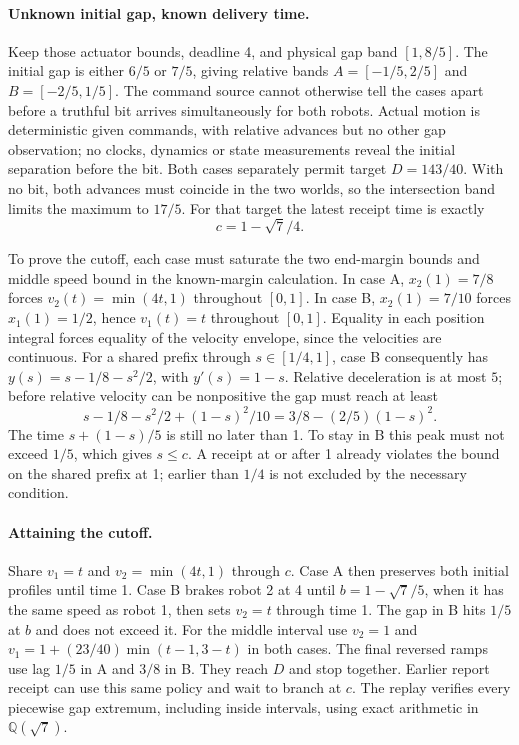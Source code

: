 \documentclass[11pt]{article}
\begin{document}
\paragraph{Unknown initial gap, known delivery time.}
Keep those actuator bounds, deadline 4, and physical gap band
\([1,8/5]\). The initial gap is either \(6/5\) or \(7/5\),
giving relative bands \(A=[-1/5,2/5]\) and \(B=[-2/5,1/5]\).
The command source cannot otherwise tell the cases apart before
a truthful bit arrives simultaneously for both robots. Actual
motion is deterministic given commands, with relative advances
but no other gap observation; no clocks, dynamics or state
measurements reveal the initial separation before the bit.
Both cases separately permit target \(D=143/40\). With no bit,
both advances must coincide in the two worlds, so the intersection
band limits the maximum to \(17/5\).
For that target the latest receipt time is exactly
\[
                              c=1-\sqrt{7}/4.
\]

To prove the cutoff, each case must saturate the two end-margin
bounds and middle speed bound in the known-margin calculation.
In case A, \(x_2(1)=7/8\) forces
\(v_2(t)=\min(4t,1)\) throughout \([0,1]\).
In case B, \(x_2(1)=7/10\) forces \(x_1(1)=1/2\), hence
\(v_1(t)=t\) throughout \([0,1]\).
Equality in each position integral forces equality of the
velocity envelope, since the velocities are continuous.
For a shared prefix through \(s\in[1/4,1]\), case B consequently
has \(y(s)=s-1/8-s^2/2\), with \(y'(s)=1-s\).
Relative deceleration is at most \(5\); before relative
velocity can be nonpositive the gap must reach at least
\[
             s-1/8-s^2/2+(1-s)^2/10
             =3/8-(2/5)(1-s)^2 .
\]
The time \(s+(1-s)/5\) is still no later than 1.
To stay in B this peak must not exceed \(1/5\), which gives
\(s\le c\). A receipt at or after 1 already violates the
bound on the shared prefix at 1; earlier than \(1/4\) is not
excluded by the necessary condition.

\paragraph{Attaining the cutoff.}
Share \(v_1=t\) and \(v_2=\min(4t,1)\) through \(c\).
Case A then preserves both initial profiles until time 1.
Case B brakes robot 2 at 4 until \(b=1-\sqrt7/5\), when it has
the same speed as robot 1, then sets \(v_2=t\) through time 1.
The gap in B hits \(1/5\) at \(b\) and does not exceed it.
For the middle interval use \(v_2=1\) and
\(v_1=1+(23/40)\min(t-1,3-t)\) in both cases.
The final reversed ramps use lag \(1/5\) in A and \(3/8\) in B.
They reach \(D\) and stop together. Earlier report receipt can
use this same policy and wait to branch at \(c\).
The replay verifies every piecewise gap extremum, including
inside intervals, using exact arithmetic in \(\mathbb Q(\sqrt7)\).
\end{document}
